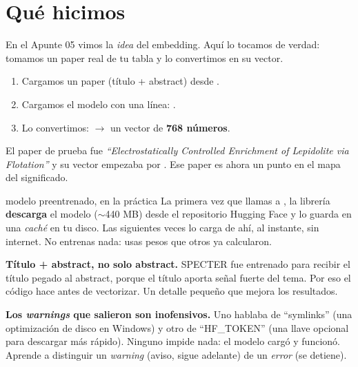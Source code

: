 \documentclass[11pt,a4paper]{article}
\begin{document}
\section{Qué hicimos}

En el Apunte 05 vimos la \emph{idea} del embedding. Aquí lo tocamos de verdad: tomamos un
paper real de tu tabla y lo convertimos en su vector.

\begin{enumerate}
  \item Cargamos un paper (título + abstract) desde .
  \item Cargamos el modelo con una línea: .
  \item Lo convertimos:  $\rightarrow$ un vector de \textbf{768 números}.
\end{enumerate}

El paper de prueba fue \emph{``Electrostatically Controlled Enrichment of Lepidolite via
Flotation''} y su vector empezaba por \codigo{[-0.59, -0.16, 1.34, ...]}. Ese paper es ahora
un punto en el mapa del significado.

\begin{concepto}{modelo preentrenado, en la práctica}
La primera vez que llamas a , la librería
\textbf{descarga} el modelo ($\sim$440 MB) desde el repositorio Hugging Face y lo guarda en
una \emph{caché} en tu disco. Las siguientes veces lo carga de ahí, al instante, sin internet.
No entrenas nada: usas pesos que otros ya calcularon.
\end{concepto}

\begin{ojo}
\textbf{Título + abstract, no solo abstract.} SPECTER fue entrenado para recibir el título
pegado al abstract, porque el título aporta señal fuerte del tema. Por eso el código hace
 antes de vectorizar. Un detalle pequeño que mejora
los resultados.
\end{ojo}

\begin{ojo}
\textbf{Los \emph{warnings} que salieron son inofensivos.} Uno hablaba de ``symlinks'' (una
optimización de disco en Windows) y otro de ``HF\_TOKEN'' (una llave opcional para descargar
más rápido). Ninguno impide nada: el modelo cargó y funcionó. Aprende a distinguir un
\emph{warning} (aviso, sigue adelante) de un \emph{error} (se detiene).
\end{ojo}
\end{document}
